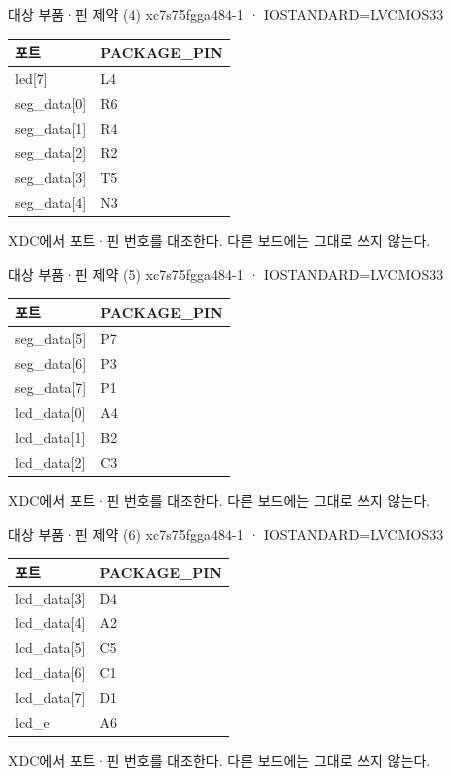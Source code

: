 \begin{frame}{대상 부품·핀 제약 (4)}\relax
\small
xc7s75fgga484-1 · IOSTANDARD=LVCMOS33\par\begin{center}\renewcommand{\arraystretch}{1.45}
\begin{tabular}{l|l}
포트 & PACKAGE\_PIN\\\hline
led[7] & L4\\
seg\_data[0] & R6\\
seg\_data[1] & R4\\
seg\_data[2] & R2\\
seg\_data[3] & T5\\
seg\_data[4] & N3\\
\end{tabular}\end{center}
XDC에서 포트·핀 번호를 대조한다. 다른 보드에는 그대로 쓰지 않는다.\par
\end{frame}

\begin{frame}{대상 부품·핀 제약 (5)}\relax
\small
xc7s75fgga484-1 · IOSTANDARD=LVCMOS33\par\begin{center}\renewcommand{\arraystretch}{1.45}
\begin{tabular}{l|l}
포트 & PACKAGE\_PIN\\\hline
seg\_data[5] & P7\\
seg\_data[6] & P3\\
seg\_data[7] & P1\\
lcd\_data[0] & A4\\
lcd\_data[1] & B2\\
lcd\_data[2] & C3\\
\end{tabular}\end{center}
XDC에서 포트·핀 번호를 대조한다. 다른 보드에는 그대로 쓰지 않는다.\par
\end{frame}

\begin{frame}{대상 부품·핀 제약 (6)}\relax
\small
xc7s75fgga484-1 · IOSTANDARD=LVCMOS33\par\begin{center}\renewcommand{\arraystretch}{1.45}
\begin{tabular}{l|l}
포트 & PACKAGE\_PIN\\\hline
lcd\_data[3] & D4\\
lcd\_data[4] & A2\\
lcd\_data[5] & C5\\
lcd\_data[6] & C1\\
lcd\_data[7] & D1\\
lcd\_e & A6\\
\end{tabular}\end{center}
XDC에서 포트·핀 번호를 대조한다. 다른 보드에는 그대로 쓰지 않는다.\par
\end{frame}

